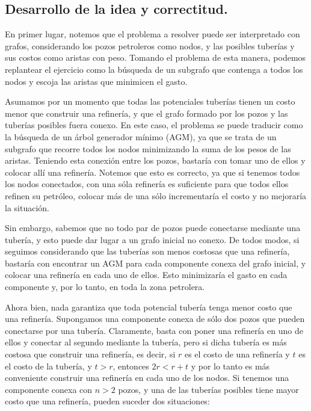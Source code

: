 \vspace*{0.6cm}

\subsection{Desarrollo de la idea y correctitud.}

\vspace*{0.3cm}

En primer lugar, notemos que el problema a resolver puede ser interpretado con grafos, considerando los pozos petroleros como nodos, y las posibles tuberías y sus costos como aristas con peso.  Tomando el problema de esta manera, podemos replantear el ejercicio como la búsqueda de un subgrafo que contenga a todos los nodos y escoja las aristas que minimicen el gasto.

Asumamos por un momento que todas las potenciales tuberías tienen un costo menor que construir una refinería, y que el grafo formado por los pozos y las tuberías posibles fuera conexo.  En este caso, el problema se puede traducir como la búsqueda de un árbol generador mínimo (AGM), ya que se trata de un subgrafo que recorre todos los nodos minimizando la suma de los pesos de las aristas.  Teniendo esta conexión entre los pozos, bastaría con tomar uno de ellos y colocar allí una refinería. Notemos que esto es correcto, ya que si tenemos todos los nodos conectados, con una sóla refinería es suficiente para que todos ellos refinen su petróleo, colocar más de una sólo incrementaría el costo y no mejoraría la situación.

Sin embargo, sabemos que no todo par de pozos puede conectarse mediante una tubería, y esto puede dar lugar a un grafo inicial no conexo.  De todos modos, si seguimos considerando que las tuberías son menos costosas que una refinería, bastaría con encontrar un AGM para cada componente conexa del grafo inicial, y colocar una refinería en cada uno de ellos. Esto minimizaría el gasto en cada componente y, por lo tanto, en toda la zona petrolera. 

Ahora bien, nada garantiza que toda potencial tubería tenga menor costo que una refinería.  Supongamos una componente conexa de sólo dos pozos que pueden conectarse por una tubería.  Claramente, basta con poner una refinería en uno de ellos y conectar al segundo mediante la tubería, pero si dicha tubería es más costosa que construir una refinería, es decir, si $r$ es el costo de una refinería y $t$ es el costo de la tubería, y $t > r$, entonces $2r < r + t$ y por lo tanto es más conveniente construir una refinería en cada uno de los nodos. Si tenemos una componente conexa con $n > 2$ pozos, y una de las tuberías posibles tiene mayor costo que una refinería, pueden suceder dos situaciones:

